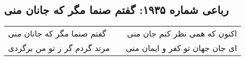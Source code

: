 \begin{center}
\section*{رباعی شماره ۱۹۳۵: گفتم صنما مگر که جانان منی}
\label{sec:1935}
\begin{longtable}{l p{0.5cm} r}
گفتم صنما مگر که جانان منی
&&
اکنون که همی نظر کنم جان منی
\\
مرتد گردم گر ز تو من برگردی
&&
ای جان جهان تو کفر و ایمان منی
\\
\end{longtable}
\end{center}

